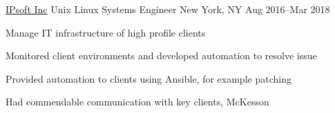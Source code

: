 


\begin{cventries}

\cventry
    {\href{www.ipsoft.com}{IPsoft Inc}}
    {Unix Linux Systems Engineer}
    {New York, NY} {Aug 2016--Mar 2018}
    {
    \begin{cvitems}
        \item Manage IT infrastructure of high profile clients
        \item Monitored client environments and developed automation to resolve issue
        \item Provided automation to clients using Ansible, for example patching
        \item Had commendable communication with key clients, McKesson
    \end{cvitems}
    }


\end{cventries}
